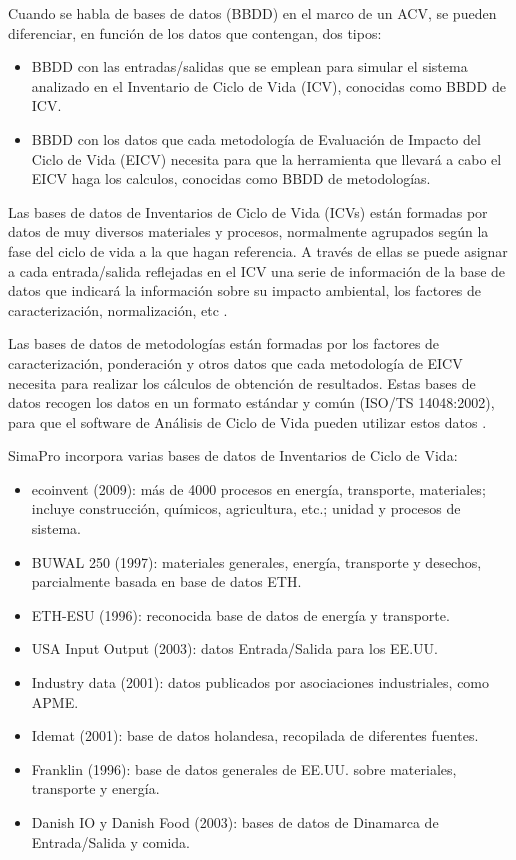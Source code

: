 Cuando se habla de bases de datos (BBDD) en el marco de un ACV, se pueden diferenciar, en función de los datos que contengan, dos tipos:
\begin{itemize}
  \item BBDD con las entradas/salidas que se emplean para simular el sistema analizado en el Inventario de Ciclo de Vida (ICV), conocidas como BBDD de ICV.
  \item BBDD con los datos que cada metodología de Evaluación de Impacto del Ciclo de Vida (EICV) necesita para que la herramienta que llevará a cabo el EICV haga los calculos, conocidas como BBDD de metodologías.
\end{itemize}

Las bases de datos de Inventarios de Ciclo de Vida (ICVs) están formadas por datos de muy diversos materiales y procesos, normalmente agrupados según la fase del ciclo de vida a la que hagan referencia. A través de ellas se puede asignar a cada entrada/salida reflejadas en el ICV una serie de información de la base de datos que indicará la información sobre su impacto ambiental, los factores de caracterización, normalización, etc \cite{ihobecarbono}.

Las bases de datos de metodologías están formadas por los factores de caracterización, ponderación y otros datos que cada metodología de EICV necesita para realizar los cálculos de obtención de resultados. Estas bases de datos recogen los datos en un formato estándar y común (ISO/TS 14048:2002), para que el software de Análisis de Ciclo de Vida pueden utilizar estos datos \cite{ihobecarbono}.

SimaPro incorpora varias bases de datos de Inventarios de Ciclo de Vida:
\begin{itemize}
  \item ecoinvent (2009): más de 4000 procesos en energía, transporte, materiales; incluye construcción, químicos, agricultura, etc.; unidad y procesos de sistema.
  \item BUWAL 250 (1997): materiales generales, energía, transporte y desechos, parcialmente basada en base de datos ETH.
  \item ETH-ESU (1996): reconocida base de datos de energía y transporte.
  \item USA Input Output (2003): datos Entrada/Salida para los EE.UU.
  \item Industry data (2001): datos publicados por asociaciones industriales, como APME.
  \item Idemat (2001): base de datos holandesa, recopilada de diferentes fuentes.
  \item Franklin (1996): base de datos generales de EE.UU. sobre materiales, transporte y energía.
  \item Danish IO y Danish Food (2003): bases de datos de Dinamarca de Entrada/Salida y comida.
\end{itemize}

